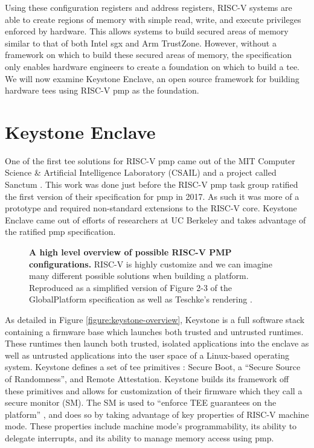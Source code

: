 Using these configuration registers and address registers, RISC-V systems are able to create regions of memory with simple read, write, and execute privileges enforced by hardware. This allows systems to build secured areas of memory similar to that of both Intel \gls{sgx} and Arm TrustZone. However, without a framework on which to build these secured areas of memory, the specification only enables hardware engineers to create a foundation on which to build a \gls{tee}. We will now examine Keystone Enclave, an open source framework for building hardware \glspl{tee} using RISC-V \gls{pmp} as the foundation.

\section{Keystone Enclave}
One of the first \gls{tee} solutions for RISC-V \gls{pmp} came out of the MIT Computer Science \& Artificial Intelligence Laboratory (CSAIL) and a project called Sanctum \cite{Costan2016a}. This work was done just before the RISC-V \gls{pmp} task group ratified the first version of their specification for \gls{pmp} in 2017. As such it was more of a prototype and required non-standard extensions to the RISC-V core. Keystone Enclave came out of efforts of researchers at UC Berkeley and takes advantage of the ratified \gls{pmp} specification.

\begin{figure}[ht]
\centering

\caption[High Level RISC-V PMP Overview]{\textbf{A high level overview of possible RISC-V PMP configurations.} RISC-V is highly customize and we can imagine many different possible solutions when building a platform. Reproduced as a simplified version of Figure 2-3 of the GlobalPlatform specification \cite{GlobalPlatform2018} as well as Teschke's rendering \cite{TeschkeSGX}.}
\label{fig:rv-hl}
\end{figure}

As detailed in Figure \ref{figure:keystone-overview}, Keystone is a full software stack containing a firmware base which launches both trusted and untrusted runtimes. These runtimes then launch both trusted, isolated applications into the enclave as well as untrusted applications into the user space of a Linux-based operating system. Keystone defines a set of \gls{tee} primitives \cite{lee2020keystone}: Secure Boot, a ``Secure Source of Randomness'', and Remote Attestation. Keystone builds its framework off these primitives and allows for customization of their firmware which they call a secure monitor (SM). The SM is used to ``enforce TEE guarantees on the platform'' \cite{lee2019keystone}, and does so by taking advantage of key properties of RISC-V machine mode. These properties include machine mode's programmability, its ability to delegate interrupts, and its ability to manage memory access using \gls{pmp}.

